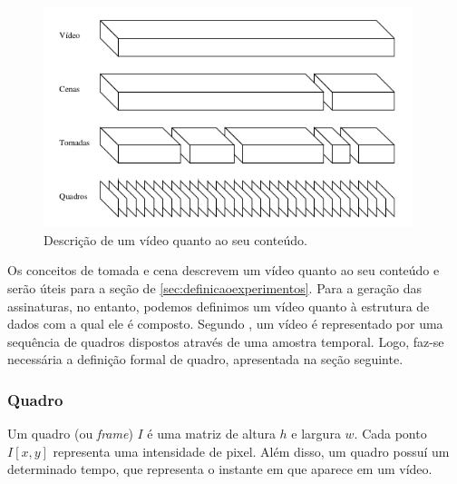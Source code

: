    \begin{figure}[h]
      \centering
      \includegraphics[width=0.96\textwidth]{dados/figuras/video.png}
      \caption{Descrição de um vídeo quanto ao seu conteúdo.}
    	\label{fig:video}
    \end{figure}

    Os conceitos de tomada e cena descrevem um vídeo quanto ao seu conteúdo e serão úteis para a seção de \ref{sec:definicaoexperimentos}. Para a geração das assinaturas, no entanto, podemos definimos um vídeo quanto à estrutura de dados com a qual ele é composto. Segundo \citeauthor{simoes2004detecccao}, um vídeo é representado por uma sequência de quadros dispostos através de uma amostra temporal. Logo, faz-se necessária a definição formal de quadro, apresentada na seção seguinte.
  

    \subsubsection{Quadro}
    \label{subsec:quadro}
    Um quadro (ou \textit{frame}) $I$ é uma matriz de altura $h$ e largura $w$. Cada ponto $I[x,y]$ representa uma intensidade de pixel. Além disso, um quadro possuí um determinado tempo, que representa o instante em que aparece em um vídeo.
      
    

